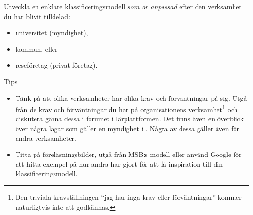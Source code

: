 \documentclass[a4paper]{llncs}
\begin{document}
Utveckla en enklare klassificeringsmodell \emph{som är anpassad} efter den 
verksamhet du har blivit tilldelad:
\begin{itemize}
  \item universitet (myndighet),
  \item kommun, eller
  \item reseföretag (privat företag).
\end{itemize}
\begin{framed}\noindent
  Tips:
  \begin{itemize}
    \item Tänk på att olika verksamheter har olika krav och förväntningar på 
      sig.
      Utgå från de krav och förväntningar du har på organisationens 
      verksamhet\footnote{%
        Den triviala kravställningen \enquote{jag har inga krav eller 
          förväntningar} kommer naturligtvis inte att godkännas.
      } och diskutera gärna dessa i forumet i lärplattformen.
      Det finns även en överblick över några lagar som gäller en myndighet 
      i \citet[bilaga B]{MSB2011v}.
      Några av dessa gäller även för andra verksamheter.
    \item Titta på föreläsningsbilder, utgå från MSB:s modell eller använd 
      Google för att hitta exempel på hur andra har gjort för att få 
      inspiration till din klassificeringsmodell.
  \end{itemize}
\end{framed}
\end{document}
